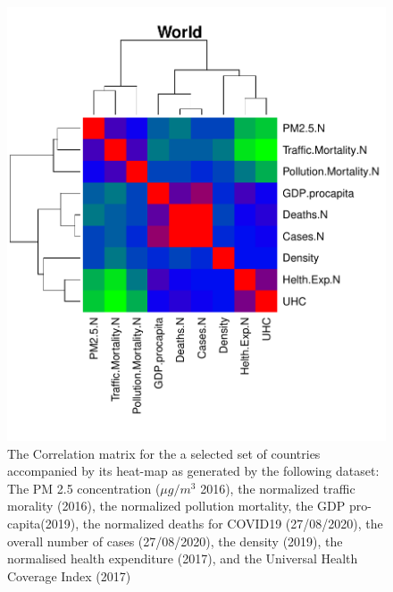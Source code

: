 \documentclass[
12pt, %
a4paper, %
oneside, %
headinclude,footinclude, %
BCOR5mm, %
]{scrartcl}
\begin{document}
\begin{figure}[h]
\begin{center}
\includegraphics[scale=1]{Pic/CorrMatrix_WORLD.pdf}
\caption{The Correlation matrix for the a selected set of countries accompanied by its heat-map as generated by the following dataset: The PM 2.5 concentration ($\mu g/m^{3}$ 2016), the normalized traffic morality (2016), the normalized pollution mortality, the GDP pro-capita(2019), the normalized deaths for COVID19 (27/08/2020), the overall number of cases (27/08/2020), the density (2019), the normalised health expenditure (2017), and the Universal Health Coverage Index (2017)}
\label{World_CorrMatrix}
\end{center}
\end{figure}
\end{document}
